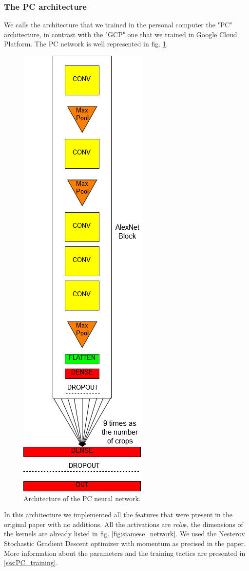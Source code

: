 \subsubsection{The PC architecture}\label{sss:PC_arch}
We calls the architecture that we trained in the personal computer the "PC" architecture, in contrast with the "GCP" one that we trained in Google Cloud Platform.\newline
The PC network is well represented in fig. \ref{fig:PC_net}.
\begin{figure}[!ht]
    \centering
    \includegraphics[scale=0.45]{images/PC_net.png}
    \caption{Architecture of the PC neural network.}
    \label{fig:PC_net}
\end{figure}
In this architecture we implemented all the features that were present in the original paper \cite{Noroozi_2016} with no additions. All the activations are \emph{relu}s, the dimensions of the kernels are already listed in fig. \ref{fig:siamese_network}. We used the Nesterov Stochastic Gradient Descent optimizer with momentum as precised in the paper. More information about the parameters and the training tactics are presented in \ref{sss:PC_training}.

